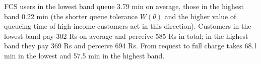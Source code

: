 FCS users in the lowest band queue 3.79 min on average, those in the highest band 0.22 min (the shorter queue tolerance $W(\theta)$ and the higher value of queueing time of high-income customers act in this direction). Customers in the lowest band pay 302 Rs on average and perceive 585 Rs in total; in the highest band they pay 369 Rs and perceive 694 Rs. From request to full charge takes 68.1 min in the lowest and 57.5 min in the highest band.
